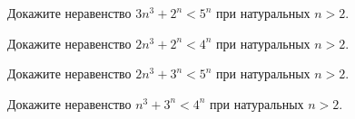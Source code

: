 
\begin{problems}

\item
Докажите неравенство $3 n^3 + 2^n < 5^n$ при натуральных $n > 2$.

\item
Докажите неравенство $2 n^3 + 2^n < 4^n$ при натуральных $n > 2$.

\item
Докажите неравенство $2 n^3 + 3^n < 5^n$ при натуральных $n > 2$.

\item
Докажите неравенство $n^3 + 3^n < 4^n$ при натуральных $n > 2$.

\end{problems}

